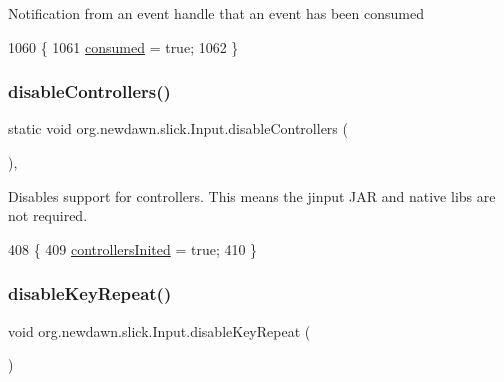 Notification from an event handle that an event has been consumed 
\begin{DoxyCode}
1060                                \{
1061         \mbox{\hyperlink{classorg_1_1newdawn_1_1slick_1_1_input_af37be3b950898acb03ac33cca068cc9a}{consumed}} = \textcolor{keyword}{true};
1062     \}
\end{DoxyCode}
\mbox{\label{classorg_1_1newdawn_1_1slick_1_1_input_aca9004d417298157170d27c1667dad55}} 
\subsubsection{\texorpdfstring{disable\+Controllers()}{disableControllers()}}
{\footnotesize\ttfamily static void org.\+newdawn.\+slick.\+Input.\+disable\+Controllers (\begin{DoxyParamCaption}{ }\end{DoxyParamCaption})\hspace{0.3cm}{\ttfamily [inline]}, {\ttfamily [static]}}

Disables support for controllers. This means the jinput J\+AR and native libs are not required. 
\begin{DoxyCode}
408                                             \{
409        \mbox{\hyperlink{classorg_1_1newdawn_1_1slick_1_1_input_ae782bdb973c10fd66f1d71dee393e506}{controllersInited}} = \textcolor{keyword}{true};
410     \}
\end{DoxyCode}
\mbox{\label{classorg_1_1newdawn_1_1slick_1_1_input_ae223c9d3e3cbc220ffb0566f5ea19f2f}} 
\subsubsection{\texorpdfstring{disable\+Key\+Repeat()}{disableKeyRepeat()}}
{\footnotesize\ttfamily void org.\+newdawn.\+slick.\+Input.\+disable\+Key\+Repeat (\begin{DoxyParamCaption}{ }\end{DoxyParamCaption})\hspace{0.3cm}{\ttfamily [inline]}}

